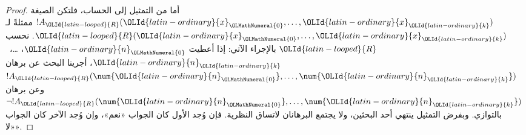 \documentclass[../../../include/open-logic-section]{subfiles}
\begin{document}
\begin{proof}
أما من التمثيل إلى الحساب، فلتكن الصيغة $!A_\OLId{latin-looped}{R}(\OLId{latin-ordinary}{x}_\OLMathNumeral{0},\dots,\OLId{latin-ordinary}{x}_\OLId{latin-ordinary}{k})$ ممثلةً
لـ$\OLId{latin-looped}{R}(\OLId{latin-ordinary}{x}_\OLMathNumeral{0},\dots,\OLId{latin-ordinary}{x}_\OLId{latin-ordinary}{k})$. نحسب $\OLId{latin-looped}{R}$ بالإجراء الآتي:
إذا أعطيت $\OLId{latin-ordinary}{n}_\OLMathNumeral{0}$، \dots،~$\OLId{latin-ordinary}{n}_\OLId{latin-ordinary}{k}$، أجرينا البحث عن برهان
$!A_\OLId{latin-looped}{R}(\num{\OLId{latin-ordinary}{n}_\OLMathNumeral{0}},\dots,\num{\OLId{latin-ordinary}{n}_\OLId{latin-ordinary}{k}})$ وعن برهان
$\lnot !A_\OLId{latin-looped}{R}(\num{\OLId{latin-ordinary}{n}_\OLMathNumeral{0}},\dots,\num{\OLId{latin-ordinary}{n}_\OLId{latin-ordinary}{k}})$ بالتوازي.
وبفرض التمثيل ينتهي أحد البحثين، ولا يجتمع البرهانان لاتساق النظرية.
فإن وُجد الأول كان الجواب «نعم»، وإن وُجد الآخر كان الجواب «لا».


\end{proof}
\end{document}
